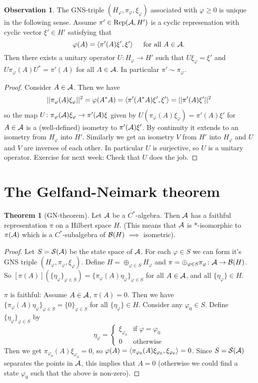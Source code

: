 \documentclass[10pt,english,a4paper]{article}
\theoremstyle{definition}
\newtheorem*{theorem}{Theorem}
\newtheorem*{observation}{Observation}
\def\pivp{\pi_{\vphi}}
\def\Hvp{H_{\vphi}}
\def\xivp{\xi_{\vphi}}
\def\etavp{\eta_{\vphi}}
\DeclareMathOperator{\Rep}{Rep}
\def\vphi{\varphi}
\begin{document}
\begin{observation}
    The GNS-triple $(H_{\vphi}, \pi_{\vphi}, \xi_{\vphi})$ associated with 
$\vphi \geq 0$ is unique in the following sense. Assume $\pi' \in \Rep(\As,H')$ is 
a cyclic represenation with cyclic vector $\xi' \in H'$ satisfying that
\[ \vphi(A) = \ind{\pi'(A)\xi',\xi'} \quad \text{ for all } A \in \As.\]
Then there exists a unitary operator $U \colon H_{\vphi}\to H'$ such that  
$U\xi_{\vphi} = \xi'$ and $U\pi_{\vphi}(A)U^* = \pi'(A)$ for all $A \in \mathcal{A}$.
In particular $\pi' \sim \pi_{\vphi}$.
\end{observation}
\begin{proof}
Consider $A \in \mathcal{A}$. Then we have 
\begin{align*}
||\pi_{\vphi}(A)\xi_{\vphi}||^2 = \vphi(A^*A) = \ind{\pi'(A^*A)\xi',\xi'} 
= ||\pi'(A)\xi'||^2  
\end{align*}
so the map
$U\colon \pi_{\vphi}(\As)\xi_{\vphi} \to\pi'(\As)\xi$ given by 
$U(\pi_{\vphi}(A)\xi_{\vphi}) = \pi'(A)\xi'$ for $A \in \mathcal{A}$ is a (well-defined)
isometry to $\pi'(\mathcal{A})\xi'$. By continuity it extends to an isometry from $H_{\vphi}$
into $H'$. Similarly we get an isometry $V$ from $H'$ into $H_{\vphi}$ and $U$
and $V$ are inverses of each other. In particular $U$ is surjective, so $U$
is a unitary operator. Exercise for next week: Check that $U$ does the job. 

\end{proof}

\section*{The Gelfand-Neimark theorem}

\begin{theorem}[GN-theorem]
    Let $\mathcal{A}$ be a $C^*$-algebra. Then $\mathcal{A}$ has a faithful
representation $\pi$ on a Hilbert space $H$. 
(This means that $\mathcal{A}$ is $*$-isomorphic to $\pi(\mathcal{A})$ which is a 
$C^*$-subalgebra of $\mathcal{B}(H)$ $\implies$ isometric).
\end{theorem}
\begin{proof}
    Let $S = \mathcal{S}(\mathcal{A})$ be the state space of $\mathcal{A}$. For each $\vphi \in S$ 
we can form it's GNS triple $(\Hvp, \pivp, \xivp)$. 
Define $H = \oplus_{\vphi \in S} \Hvp$ and $\pi = \oplus_{\vphi \in S} \pi_{\vphi} \colon
\As\to \Bs(H)$. So $[\pi(A)](\{\etavp\}_{\vphi\in S}) = \{ \pivp(A)\etavp\}_{\vphi \in S}$
for all $A \in \mathcal{A}$, and all $\{\etavp\} \in H$.

$\pi$ is faithful: Assume $A\in \mathcal{A}$, $\pi(A) =0$. Then we have 
$\{ \pivp(A)\etavp \}_{\vphi\in S} = \{0\}_{\vphi \in S}$ for all $\{\etavp\}
\in H$. Consider any $\vphi_0 \in S$. Define $\{\etavp\}_{\vphi \in S}$ by
\[ \etavp = \begin{cases} \xi_{\vphi_0} & \text{if } \vphi = \vphi_0 \\
0 & \text{otherwise} \end{cases} \]
Then we get $\pi_{\vphi_0}(A) \xi_{\vphi_0} = 0$, so $\vphi(A) = \ind{\pi_{\vphi_0}(A)\xi_{\vphi_0}, \xi_{\vphi_0}}= 0$.
Since $S = \mathcal{S}(\mathcal{A})$ separates the points in $\mathcal{A}$, this implies that $A=0$ 
(otherwise we could find a state $\vphi_0$ such that the above is non-zero).
\end{proof}
\end{document}
